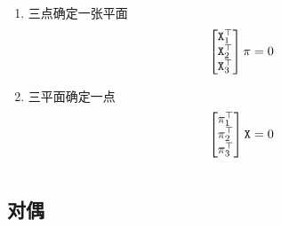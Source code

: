 \documentclass[utf-8,xcolor=dvips,slidestop,compress,mathserif]{beamer}
\begin{document}
{\begin{columns}[t]
\begin{column}{.48\linewidth}
\begin{block}
\begin{enumerate}
{\begin{beamercolorbox}[%
              rounded=true,shadow=false,wd=16mm,center,colsep=-2pt]{mycolor1}
              $\pi^{\top}\mathtt{X}=0$
            \end{beamercolorbox}}
        \item 三点确定一张平面 \\
          \vspace{-2mm}
            \begin{eqnarray*}\vspace{-2mm}
              \begin{bmatrix}
                \mathtt{X}_{1}^{\top} \\ \mathtt{X}_{2}^{\top} \\ \mathtt{X}_{3}^{\top}
              \end{bmatrix}
              \pi = 0
            \end{eqnarray*}
          \item 三平面确定一点 \\
            \vspace{-2mm}
            \begin{eqnarray*}\vspace{-2mm}
              \begin{bmatrix}
                \mathtt{\pi}_{1}^{\top} \\ \mathtt{\pi}_{2}^{\top} \\ \mathtt{\pi}_{3}^{\top}
              \end{bmatrix}
              \mathtt{X} = 0
            \end{eqnarray*}
        \end{enumerate}
      \end{block}
    \end{column}
  \end{columns}
}


\subsection{对偶}
\end{document}
